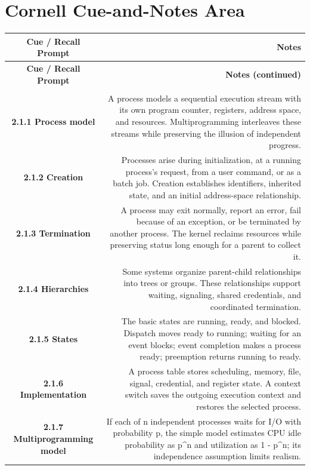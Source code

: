 \documentclass[10pt,letterpaper]{article}
\begin{document}
\section*{Cornell Cue-and-Notes Area}
\small
\begin{longtable}{C N}
\color{white}\textbf{Cue / Recall Prompt} &
\color{white}\textbf{Notes}\\
\endfirsthead
{}
\color{white}\textbf{Cue / Recall Prompt} &
\color{white}\textbf{Notes (continued)}\\
\endhead
{}\\*\hline
\textbf{2.1.1 Process model} & A process models a sequential execution stream with its own program counter, registers, address space, and resources. Multiprogramming interleaves these streams while preserving the illusion of independent progress.\\\hline
\textbf{2.1.2 Creation} & Processes arise during initialization, at a running process's request, from a user command, or as a batch job. Creation establishes identifiers, inherited state, and an initial address-space relationship.\\\hline
\textbf{2.1.3 Termination} & A process may exit normally, report an error, fail because of an exception, or be terminated by another process. The kernel reclaims resources while preserving status long enough for a parent to collect it.\\\hline
\textbf{2.1.4 Hierarchies} & Some systems organize parent-child relationships into trees or groups. These relationships support waiting, signaling, shared credentials, and coordinated termination.\\\hline
\textbf{2.1.5 States} & The basic states are running, ready, and blocked. Dispatch moves ready to running; waiting for an event blocks; event completion makes a process ready; preemption returns running to ready.\\\hline
\textbf{2.1.6 Implementation} & A process table stores scheduling, memory, file, signal, credential, and register state. A context switch saves the outgoing execution context and restores the selected process.\\\hline
\textbf{2.1.7 Multiprogramming model} & If each of n independent processes waits for I/O with probability p, the simple model estimates CPU idle probability as p\textasciicircum{}n and utilization as 1 - p\textasciicircum{}n; its independence assumption limits realism.\\\hline

\end{longtable}
\end{document}
